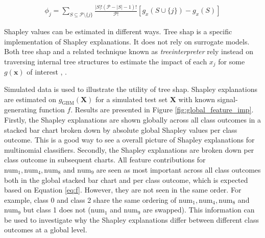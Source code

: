 \documentclass{article}
\begin{document}
\begin{equation}
\label{eq:shap_contrib}
\begin{aligned}
\phi_{j} = \sum_{S \subseteq \mathcal{P} \setminus \{j\}}\frac{|S|!(\mathcal{P} -|S| -1)!}{\mathcal{P}!}[g_x(S \cup \{j\}) - g_x(S)]
\end{aligned}
\end{equation}

Shapley values can be estimated in different ways. Tree shap is a specific implementation of Shapley explanations. It does not rely on surrogate models. Both tree shap and a related technique known as \textit{treeinterpreter} rely instead on traversing internal tree structures to estimate the impact of each $x_j$ for some $g(\mathbf{x})$ of interest \cite{tree_shap}, \cite{treeinterpreter}.

Simulated data is used to illustrate the utility of tree shap. Shapley explanations are estimated on $g_{\text{GBM}}(\mathbf{X})$ for a simulated test set $\mathbf{X}$ with known signal-generating function $f$. Results are presented in Figure \ref{fig:global_feature_imp}. Firstly, the Shapley explanations are shown globally across all class outcomes in a stacked bar chart broken down by absolute global Shapley values per class outcome. This is a good way to see a overall picture of Shapley explanations for multinomial classifiers. Secondly, the Shapley explanations are broken down per class outcome in subsequent charts. All feature contributions for $\text{num}_1, \text{num}_4, \text{num}_8$ and $\text{num}_9$ are seen as most important across all class outcomes both in the global stacked bar chart and per class outcome, which is expected based on Equation \ref{eq:f}. However, they are not seen in the same order. For example, class 0 and class 2 share the same ordering of $\text{num}_1, \text{num}_4, \text{num}_8$ and $\text{num}_9$ but class 1 does not ($\text{num}_1$ and $\text{num}_9$ are swapped). This information can be used to investigate why the Shapley explanations differ between different class outcomes at a global level.
\end{document}
